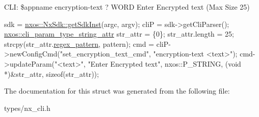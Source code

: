 C\+LI\+: \$appname encryption-\/text ? W\+O\+RD Enter Encrypted text (Max Size 25) ~\newline
 
\begin{DoxyCode}
sdk = \mbox{\hyperlink{classnxos_1_1_nx_sdk_a5050e2d26c40744b4fc7862068a83f39}{nxos::NxSdk::getSdkInst}}(argc, argv);
cliP = sdk->getCliParser();
\mbox{\hyperlink{structnxos_1_1cli__param__type__string__attr__}{nxos::cli\_param\_type\_string\_attr}} str\_attr = \{0\};
str\_attr.length = 25;
strcpy(str\_attr.\mbox{\hyperlink{structnxos_1_1cli__param__type__string__attr___a2a547a1318e243011f100535aebf0a49}{regex\_pattern}}, pattern);
cmd = cliP->newConfigCmd(\textcolor{stringliteral}{"set\_encryption\_text\_cmd"},
                         \textcolor{stringliteral}{"encryption-text <text>"});
cmd->updateParam(\textcolor{stringliteral}{"<text>"}, \textcolor{stringliteral}{"Enter Encrypted text"}, nxos::P\_STRING,
                 (\textcolor{keywordtype}{void} *)&str\_attr, \textcolor{keyword}{sizeof}(str\_attr));
\end{DoxyCode}



 

The documentation for this struct was generated from the following file\+:\begin{DoxyCompactItemize}
\item 
types/nx\+\_\+cli.\+h\end{DoxyCompactItemize}
